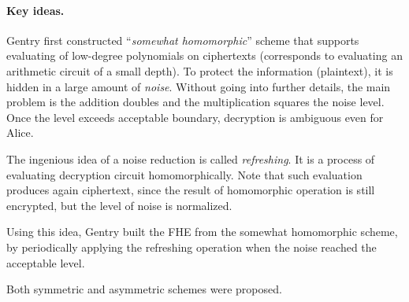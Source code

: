 \documentclass[11pt,oneside,final]{fithesis2}
\begin{document}
    \paragraph*{Key ideas.} 
    Gentry first constructed ``\emph{somewhat homomorphic}'' scheme that supports evaluating of low-degree polynomials on ciphertexts 
    (corresponds to evaluating an arithmetic circuit of a small depth).
    To protect the information (plaintext), it is hidden in a large amount of \emph{noise}. Without going into further details, the main problem 
    is the addition doubles and the multiplication squares the noise level. Once the level exceeds acceptable boundary, 
    decryption is ambiguous even for Alice. 
    
    The ingenious idea of a noise reduction is called \emph{refreshing}. It is a process of evaluating decryption circuit 
    homomorphically. Note that such evaluation produces again ciphertext, since the result of homomorphic operation is still encrypted, but the level of noise is normalized. 
    
    Using this idea, Gentry built the FHE from the somewhat homomorphic scheme, by periodically applying the refreshing 
    operation when the noise reached the acceptable level.
    
    Both symmetric and asymmetric schemes were proposed.
\end{document}
